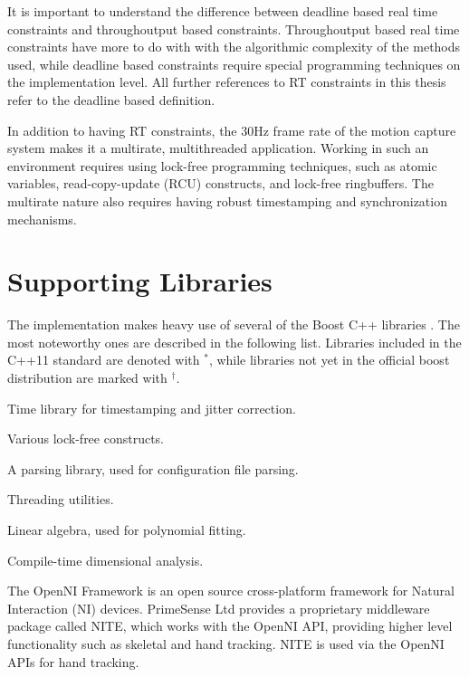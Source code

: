 It is important to understand the difference between
deadline based real time constraints
and throughoutput based constraints.
Throughoutput based real time constraints have
more to do with with the algorithmic complexity
of the methods used,
while deadline based constraints
require special programming techniques on the implementation level.
All further references to RT constraints in this thesis
refer to the deadline based definition.

In addition to having RT constraints,
the 30Hz frame rate of the motion capture system
makes it a multirate, multithreaded application.
Working in such an environment requires using
lock-free programming techniques,
such as atomic variables, read-copy-update (RCU) constructs,
and lock-free ringbuffers.
The multirate nature also requires having robust timestamping and synchronization mechanisms.


\section{Supporting Libraries}
\label{sec:supporting_libraries}

The implementation makes heavy use of several of the Boost C++ libraries \cite{boost}.
The most noteworthy ones are described in the following list.
Libraries included in the C++11 standard \cite{cpp11}
are denoted with $^*$,
while libraries not yet in the official boost distribution
are marked with $^\dagger$.
\begin{description}[leftmargin=14ex]
\item[Chrono$^*$] Time library for timestamping and jitter correction.
\item[Geometry] 
\item[Lockfree$^\dagger$] Various lock-free constructs.
\item[Spirit] A parsing library, used for configuration file parsing.
\item[Thread$^*$] Threading utilities.
\item[uBLAS] Linear algebra, used for polynomial fitting.
\item[Units] Compile-time dimensional analysis.
\end{description}

The OpenNI Framework \cite{openni} is an open source cross-platform
framework for Natural Interaction (NI) devices.
PrimeSense Ltd \cite{primesense} provides a proprietary
middleware package called NITE,
which works with the OpenNI API,
providing higher level functionality such as skeletal and hand tracking.
NITE is used via the OpenNI APIs for hand tracking.

